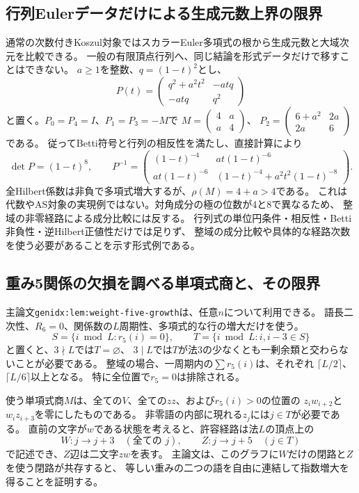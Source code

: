 \documentclass[11pt,a4paper]{ltjsarticle}
\begin{document}
\subsection{行列Eulerデータだけによる生成元数上界の限界}
\label{note:matrix-generator-bound-obstruction}
通常の次数付きKoszul対象ではスカラーEuler多項式の根から生成元数と大域次元を比較できる。
一般の有限頂点行列へ、同じ結論を形式データだけで移すことはできない。
$a\ge1$を整数、$q=(1-t)^2$とし、
\[
P(t)=\begin{pmatrix}q^2+a^2t^2&-atq\\-atq&q^2\end{pmatrix}
\]
と置く。$P_0=P_4=I$、$P_1=P_3=-M$で
$M=\left(\begin{smallmatrix}4&a\\a&4\end{smallmatrix}\right)$、
$P_2=\left(\begin{smallmatrix}6+a^2&2a\\2a&6\end{smallmatrix}\right)$である。
従ってBetti符号と行列の相反性を満たし、直接計算により
\[
\det P=(1-t)^8,\qquad
P^{-1}=\begin{pmatrix}
(1-t)^{-4}&at(1-t)^{-6}\\
at(1-t)^{-6}&(1-t)^{-4}+a^2t^2(1-t)^{-8}
\end{pmatrix}.
\]
全Hilbert係数は非負で多項式増大するが、$\rho(M)=4+a>4$である。
これは代数やAS対象の実現例ではない。対角成分の極の位数が4と8で異なるため、
整域の非零経路による成分比較には反する。
行列式の単位円条件・相反性・Betti非負性・逆Hilbert正値性だけでは足りず、
整域の成分比較や具体的な経路次数を使う必要があることを示す形式例である。

\subsection{重み5関係の欠損を調べる単項式商と、その限界}
\label{note:general-r5-growth-limit}
主論文\texttt{genidx:lem:weight-five-growth}は、任意$n$について利用できる。
語長二次性、$R_6=0$、関係数の$L$周期性、多項式的な行の増大だけを使う。
\[
S=\{i\bmod L:r_5(i)=0\},\qquad
T=\{i\bmod L:i,i-3\in S\}
\]
と置くと、$3\nmid L$では$T=\varnothing$、
$3\mid L$では$T$が法3の少なくとも一剰余類と交わらないことが必要である。
整域の場合、一周期内の$\sum r_5(i)$は、それぞれ
$\lceil L/2\rceil$、$\lceil L/6\rceil$以上となる。
特に全位置で$r_5=0$は排除される。

使う単項式商$M$は、全ての$V$、全ての$zz$、および$r_5(i)>0$の位置の
$z_iw_{i+2}$と$w_iz_{i+3}$を零にしたものである。
非零語の内部に現れる$z_j$には$j\in T$が必要である。
直前の文字が$w$である状態を考えると、許容経路は法$L$の頂点上の
\[
W:j\to j+3\quad(\text{全ての }j),\qquad
Z:j\to j+5\quad(j\in T)
\]
で記述でき、$Z$辺は二文字$zw$を表す。
主論文は、このグラフに$W$だけの閉路と$Z$を使う閉路が共存すると、
等しい重みの二つの語を自由に連結して指数増大を得ることを証明する。
\end{document}
